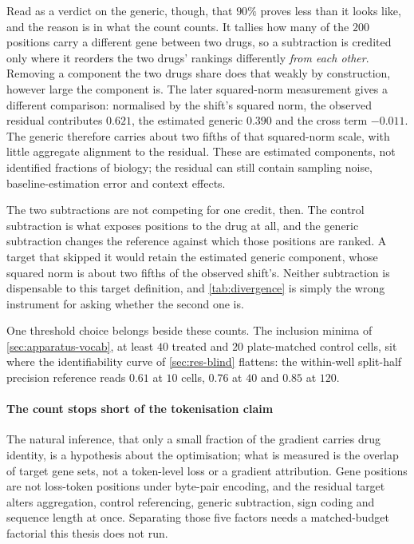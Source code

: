   Read as a verdict on the generic, though, that $90\%$ proves less than it looks
  like, and the reason is in what the count counts. It tallies how many of the $200$
  positions carry a different gene between two drugs, so a subtraction is credited
  only where it reorders the two drugs' rankings differently \emph{from each other}.
  Removing a component the two drugs share does that weakly by construction, however
  large the component is. The later squared-norm measurement gives a different
  comparison: normalised by the shift's squared norm, the observed residual
  contributes $0.621$, the estimated generic $0.390$ and the cross term $-0.011$.
  The generic therefore carries about two fifths of that squared-norm scale,
  with little aggregate alignment to the residual. These are estimated
  components, not identified fractions of biology; the residual can still
  contain sampling noise, baseline-estimation error and context effects.
  
  The two subtractions are not competing for one credit, then. The control
  subtraction is what exposes positions to the drug at all, and the generic
  subtraction changes the reference against which those positions are ranked.
  A target that skipped it would retain the estimated generic component, whose
  squared norm is about two fifths of the observed shift's. Neither subtraction
  is dispensable to this target definition, and
  \cref{tab:divergence} is simply the wrong instrument for asking whether the second
  one is.
  
  One threshold choice belongs beside these counts. The inclusion minima of
  \cref{sec:apparatus-vocab}, at least $40$ treated and $20$ plate-matched control
  cells, sit where the identifiability curve of \cref{sec:res-blind} flattens: the
  within-well split-half precision reference reads $0.61$ at $10$ cells, $0.76$ at
  $40$ and $0.85$ at $120$.
  
  \paragraph{The count stops short of the tokenisation claim} The natural inference,
  that only a small fraction of the gradient carries drug identity, is a hypothesis
  about the optimisation; what is measured is the overlap of target gene sets, not a
  token-level loss or a gradient attribution. Gene positions are not loss-token
  positions under byte-pair encoding, and the residual target alters aggregation,
  control referencing, generic subtraction, sign coding and sequence length at once.
  Separating those five factors needs a matched-budget factorial this thesis does not
  run.
  
